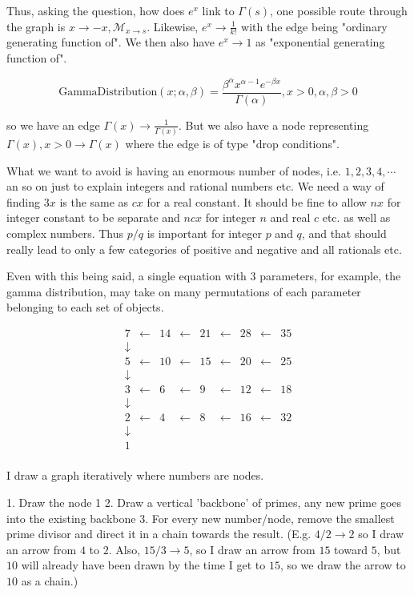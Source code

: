 \documentclass{article}
\begin{document}
Thus, asking the question, how does $e^x$ link to $\Gamma(s)$, one possible route through the graph is $x \to -x, \mathcal{M}_{x \to s}$. Likewise, $e^x \to \frac{1}{k!}$ with the edge being "ordinary generating function of". We then also have $e^x \to 1$ as "exponential generating function of".

$$
\textrm{GammaDistribution}(x;\alpha,\beta) = \frac{\beta^\alpha x^{\alpha-1} e^{-\beta x}}{\Gamma(\alpha)}, x > 0, \alpha,\beta > 0
$$

so we have an edge $\Gamma(x) \to \frac{1}{\Gamma(x)}$. But we also have a node representing $\Gamma(x), x>0 \to \Gamma(x)$ where the edge is of type "drop conditions".

What we want to avoid is having an enormous number of nodes, i.e. $1,2,3,4,\cdots$ an so on just to explain integers and rational numbers etc. We need a way of finding $3 x$ is the same as $c x$ for a real constant. It should be fine to allow $n x$ for integer constant to be separate and $n c x$ for integer $n$ and real $c$ etc. as well as complex numbers. Thus $p/q$ is important for integer $p$ and $q$, and that should really lead to only a few categories of positive and negative and all rationals etc.

Even with this being said, a single equation with $3$ parameters, for example, the gamma distribution, may take on many permutations of each parameter belonging to each set of objects.

$$
\begin{matrix}
7 &\leftarrow &14 &\leftarrow &21 &\leftarrow &28 &\leftarrow &35 \\
\downarrow \\
5 &\leftarrow &10 &\leftarrow &15 &\leftarrow &20 &\leftarrow &25 \\
\downarrow \\
3 &\leftarrow &6 &\leftarrow &9 &\leftarrow &12 &\leftarrow &18 \\
\downarrow \\
2 &\leftarrow &4 &\leftarrow &8 &\leftarrow &16 &\leftarrow &32 \\
\downarrow \\
1  \\
\end{matrix}
$$

I draw a graph iteratively where numbers are nodes. 

 1. Draw the node 1
 2. Draw a vertical 'backbone' of primes, any new prime goes into the existing backbone
 3. For every new number/node, remove the smallest prime divisor and direct it in a chain towards the result. (E.g. $4/2 \to 2$ so I draw an arrow from $4$ to $2$. Also, $15/3 \to 5$, so I draw an arrow from $15$ toward $5$, but $10$ will already have been drawn by the time I get to $15$, so we draw the arrow to $10$ as a chain.)
\end{document}
